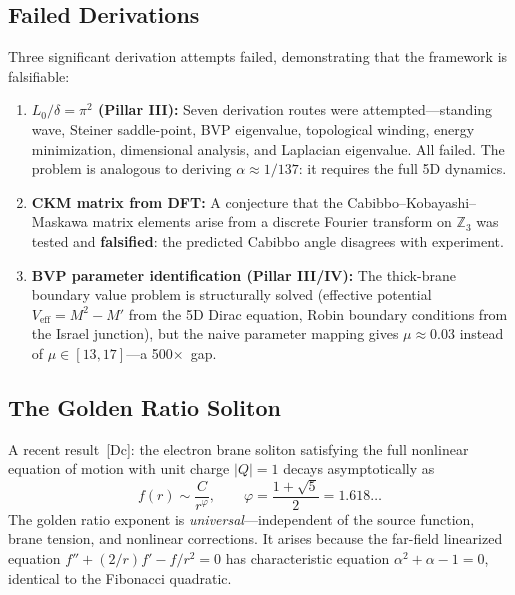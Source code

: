 \documentclass[12pt,a4paper]{article}
\theoremstyle{definition}
\theoremstyle{remark}
\newcommand{\tagDc}{\textsf{[Dc]}}
\newcommand{\Zn}[1]{\mathbb{Z}_{#1}}
\begin{document}
\subsection{Failed Derivations}

Three significant derivation attempts failed, demonstrating that the
framework is falsifiable:

\begin{enumerate}[nosep]
\item \textbf{$L_0/\delta = \pi^2$ (Pillar III):} Seven derivation
  routes were attempted---standing wave, Steiner saddle-point, BVP
  eigenvalue, topological winding, energy minimization, dimensional
  analysis, and Laplacian eigenvalue.  All failed.  The problem is
  analogous to deriving $\alpha \approx 1/137$: it requires the full
  5D dynamics.

\item \textbf{CKM matrix from DFT:} A conjecture that the
  Cabibbo--Kobayashi--Maskawa matrix elements arise from a discrete
  Fourier transform on $\Zn{3}$ was tested and \textbf{falsified}:
  the predicted Cabibbo angle disagrees with experiment.

\item \textbf{BVP parameter identification (Pillar III/IV):}
  The thick-brane boundary value problem is structurally solved
  (effective potential $V_{\mathrm{eff}} = M^2 - M'$ from the 5D
  Dirac equation, Robin boundary conditions from the Israel
  junction), but the naive parameter mapping gives $\mu \approx 0.03$
  instead of $\mu \in [13, 17]$---a 500$\times$~gap.
\end{enumerate}

\subsection{The Golden Ratio Soliton}

A recent result~\tagDc: the electron brane soliton satisfying
the full nonlinear equation of motion with unit charge $|Q| = 1$
decays asymptotically as
\begin{equation}
  f(r) \sim \frac{C}{r^\varphi},
  \qquad
  \varphi = \frac{1 + \sqrt{5}}{2} = 1.618\ldots
  \label{eq:golden}
\end{equation}
The golden ratio exponent is \emph{universal}---independent of the
source function, brane tension, and nonlinear corrections.  It arises
because the far-field linearized equation $f'' + (2/r)f' - f/r^2 = 0$
has characteristic equation $\alpha^2 + \alpha - 1 = 0$, identical
to the Fibonacci quadratic.
\end{document}
